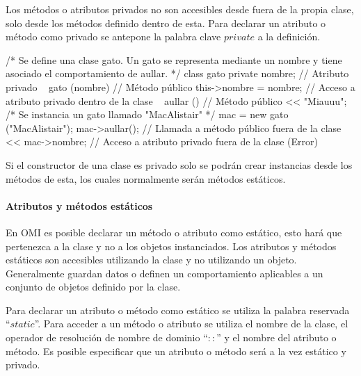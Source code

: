 Los métodos o atributos privados no son accesibles desde fuera de la propia clase, solo desde los métodos definido dentro de esta. Para 
declarar un atributo o método como privado se antepone la palabra clave $private$ a la definición. \\

\begin{myverbatim}
   /*
      Se define una clase gato. Un gato 
      se representa mediante un nombre y tiene
      asociado el comportamiento de aullar.
   */
   class gato {
      private nombre; // Atributo privado
      ~ gato (nombre) { // Método público
        this->nombre = nombre; // Acceso a atributo privado dentro de la clase
      }
      ~ aullar () { // Método público
         << "Miauuu";
      }
   }
   /*
      Se instancia un gato 
      llamado "MacAlistair"
   */
   mac = new gato ("MacAlistair"); 
   mac->aullar(); // Llamada a método público fuera de la clase
   << mac->nombre;  // Acceso a atributo privado fuera de la clase (Error)
\end{myverbatim}

Si el constructor de una clase es privado solo se podrán crear instancias desde los métodos de esta, los cuales normalmente serán métodos estáticos. 

\paragraph{Atributos y métodos estáticos}

En OMI es posible declarar un método o atributo como estático, esto hará que pertenezca a la clase y no a los objetos instanciados. 
Los atributos y métodos estáticos son accesibles utilizando la clase y no utilizando un objeto. Generalmente guardan datos o definen un 
comportamiento aplicables a un conjunto de objetos definido por la clase. 

Para declarar un atributo o método como estático se utiliza la palabra reservada ``$static$''. Para acceder a un método o atributo se utiliza el
nombre de la clase, el operador de resolución de nombre de dominio ``$::$'' y el nombre del atributo o método. Es posible especificar que 
un atributo o método será a la vez estático y privado. \\

